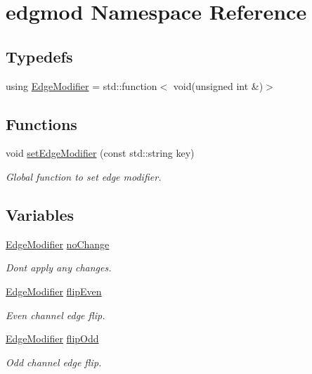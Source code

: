 \hypertarget{namespaceedgmod}{}\section{edgmod Namespace Reference}
\label{namespaceedgmod}
\subsection*{Typedefs}
\begin{DoxyCompactItemize}
\item 
using \hyperlink{namespaceedgmod_abd975beb42f73310619eb134f62d7712}{Edge\+Modifier} = std\+::function$<$ void(unsigned int \&)$>$
\end{DoxyCompactItemize}
\subsection*{Functions}
\begin{DoxyCompactItemize}
\item 
void \hyperlink{namespaceedgmod_abf9bf9a87d7a5e31d233545b0e8a3c36}{set\+Edge\+Modifier} (const std\+::string key)
\begin{DoxyCompactList}\small\item\em Global function to set edge modifier. \end{DoxyCompactList}\end{DoxyCompactItemize}
\subsection*{Variables}
\begin{DoxyCompactItemize}
\item 
\hyperlink{namespaceedgmod_abd975beb42f73310619eb134f62d7712}{Edge\+Modifier} \hyperlink{namespaceedgmod_a912724097db2099cc7793a83e42673d7}{no\+Change}
\begin{DoxyCompactList}\small\item\em Don\textquotesingle{}t apply any changes. \end{DoxyCompactList}\item 
\hyperlink{namespaceedgmod_abd975beb42f73310619eb134f62d7712}{Edge\+Modifier} \hyperlink{namespaceedgmod_af31c90c50e8178bf4618a65e5252faff}{flip\+Even}
\begin{DoxyCompactList}\small\item\em Even channel edge flip. \end{DoxyCompactList}\item 
\hyperlink{namespaceedgmod_abd975beb42f73310619eb134f62d7712}{Edge\+Modifier} \hyperlink{namespaceedgmod_abedd27017e7b73a6aaf3aae39d324eb6}{flip\+Odd}
\begin{DoxyCompactList}\small\item\em Odd channel edge flip. \end{DoxyCompactList}\end{DoxyCompactItemize}


